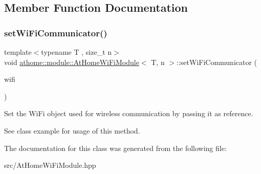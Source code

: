 \subsection{Member Function Documentation}
\mbox{\label{classathome_1_1module_1_1_at_home_wi_fi_module_a610d2e99c11fdd4b6afbfe65ee2e56d5}} 
\subsubsection{\texorpdfstring{set\+Wi\+Fi\+Communicator()}{setWiFiCommunicator()}}
{\footnotesize\ttfamily template$<$typename T , size\+\_\+t n$>$ \\
void \mbox{\hyperlink{classathome_1_1module_1_1_at_home_wi_fi_module}{athome\+::module\+::\+At\+Home\+Wi\+Fi\+Module}}$<$ T, n $>$\+::set\+Wi\+Fi\+Communicator (\begin{DoxyParamCaption}\item[{\mbox{\hyperlink{classathome_1_1communication_1_1wifi_1_1_a_wi_fi_communicator}{communication\+::wifi\+::\+A\+Wi\+Fi\+Communicator}} \&}]{wifi }\end{DoxyParamCaption})\hspace{0.3cm}{\ttfamily [inline]}}

Set the Wi\+Fi object used for wireless communication by passing it as reference.

See class example for usage of this method. 

The documentation for this class was generated from the following file\+:\begin{DoxyCompactItemize}
\item 
src/At\+Home\+Wi\+Fi\+Module.\+hpp\end{DoxyCompactItemize}
